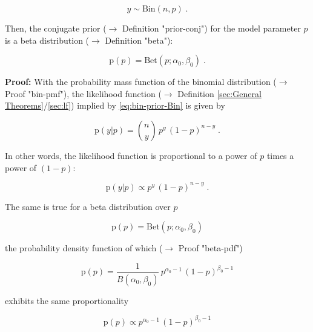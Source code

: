 \documentclass[a4paper,12pt]{book}
\begin{document}
\begin{equation} \label{eq:bin-prior-Bin}
y \sim \mathrm{Bin}(n,p) \; .
\end{equation}

Then, the conjugate prior ($\rightarrow$ Definition "prior-conj") for the model parameter $p$ is a beta distribution ($\rightarrow$ Definition "beta"):

\begin{equation} \label{eq:bin-prior-Beta}
\mathrm{p}(p) = \mathrm{Bet}(p; \alpha_0, \beta_0) \; .
\end{equation}


\vspace{1em}
\textbf{Proof:} With the probability mass function of the binomial distribution ($\rightarrow$ Proof "bin-pmf"), the likelihood function ($\rightarrow$ Definition \ref{sec:General Theorems}/\ref{sec:lf}) implied by \eqref{eq:bin-prior-Bin} is given by

\begin{equation} \label{eq:bin-prior-Bin-LF}
\mathrm{p}(y|p) = {n \choose y} \, p^y \, (1-p)^{n-y} \; .
\end{equation}

In other words, the likelihood function is proportional to a power of $p$ times a power of $(1-p)$:

\begin{equation} \label{eq:bin-prior-Bin-LF-prop}
\mathrm{p}(y|p) \propto p^y \, (1-p)^{n-y} \; .
\end{equation}

The same is true for a beta distribution over $p$

\begin{equation} \label{eq:bin-prior-Bin-prior-s1}
\mathrm{p}(p) = \mathrm{Bet}(p; \alpha_0, \beta_0)
\end{equation}

the probability density function of which ($\rightarrow$ Proof "beta-pdf")

\begin{equation} \label{eq:bin-prior-Bin-prior-s2}
\mathrm{p}(p) = \frac{1}{B(\alpha_0,\beta_0)} \, p^{\alpha_0-1} \, (1-p)^{\beta_0-1}
\end{equation}

exhibits the same proportionality

\begin{equation} \label{eq:bin-prior-Bin-prior-s3}
\mathrm{p}(p) \propto p^{\alpha_0-1} \, (1-p)^{\beta_0-1}
\end{equation}
\end{document}
